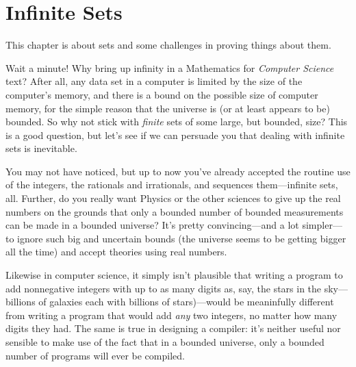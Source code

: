 \newcommand{\nohalt}{\text{\small{No-halt}}}
\newcommand{\asciibet}{\text{ASCII}}
\newcommand{\asciistr}{\strings{\asciibet}}

\chapter{Infinite Sets}\label{infinite_chap}\label{set_theory_chap}

This chapter is about  sets and some challenges in
proving things about them.

Wait a minute!  Why bring up infinity in a Mathematics for
\emph{Computer Science} text?  After all, any data set in a computer
is limited by the size of the computer's memory, and there is a bound
on the possible size of computer memory, for the simple reason that
the universe is (or at least appears to be) bounded.  So why not stick
with \emph{finite} sets of some large, but bounded, size?  This
is a good question, but let's see if we can persuade you that dealing
with infinite sets is inevitable.

\iffalse We've run into a lot of computer science students who wonder
why they should care about infinite sets.  They point out that
\fi

You may not have noticed, but up to now you've already accepted the
routine use of the integers, the rationals and irrationals, and
sequences them---infinite sets, all.  Further, do you really want
Physics or the other sciences to give up the real numbers on the
grounds that only a bounded number of bounded measurements can be made
in a bounded universe?  It's pretty convincing---and a lot
simpler---to ignore such big and uncertain bounds (the universe seems
to be getting bigger all the time) and accept theories using real
numbers.

Likewise in computer science, it simply isn't plausible that writing a
program to add nonnegative integers with up to as many digits as, say,
the stars in the sky---billions of galaxies each with billions of
stars)---would be meaninfully different from writing a program that
would add \emph{any} two integers, no matter how many digits they had.
The same is true in designing a compiler: it's neither useful nor
sensible to make use of the fact that in a bounded universe, only a
bounded number of programs will ever be compiled.

